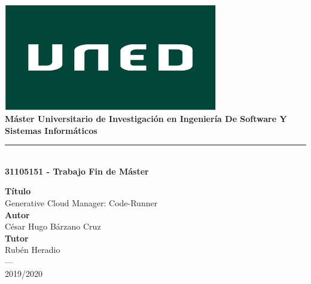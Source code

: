\begin{titlepage}
 
 
\newlength{\centeroffset}
\setlength{\centeroffset}{-0.5\oddsidemargin}
\addtolength{\centeroffset}{0.5\evensidemargin}
\thispagestyle{empty}

\noindent\hspace*{\centeroffset}\begin{minipage}{\textwidth}

\centering
\includegraphics[width=0.7\textwidth]{imagenes/Logo-uned.jpg}\\[1.1cm]


{\Huge\bfseries Máster Universitario de Investigación en Ingeniería De Software Y Sistemas Informáticos\\
}
\noindent\rule[-1ex]{\textwidth}{3pt}\\[3.5ex]
{\large\bfseries 31105151 - Trabajo Fin de Máster}
\end{minipage}

\vspace{2.5cm}
\noindent\hspace*{\centeroffset}\begin{minipage}{\textwidth}
\centering

\textbf{Título}\\ {Generative Cloud Manager: Code-Runner}\\[3.5ex]
\textbf{Autor}\\ {César Hugo Bárzano Cruz}\\[2.5ex]
\textbf{Tutor}\\ {Rubén Heradio}\\[2.5ex]



\textsc{---}\\
2019/2020
\end{minipage}
\end{titlepage}


